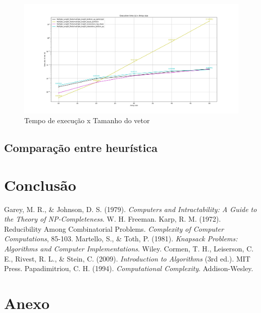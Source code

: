\documentclass{article}
\begin{document}
\begin{figure} [H]
    \centering
    \caption{Tempo de execução x Tamanho do vetor}
    \includegraphics[width=1\textwidth]{images/multiple_length_tabulation_bottom_up}
\end{figure}

\subsection{Comparação entre heurística}


\section{Conclusão}




\begin{thebibliography}{99}
 Garey, M. R., \& Johnson, D. S. (1979). \textit{Computers and Intractability: A Guide to the Theory of NP-Completeness}. W. H. Freeman.
 Karp, R. M. (1972). Reducibility Among Combinatorial Problems. \textit{Complexity of Computer Computations}, 85-103.
 Martello, S., \& Toth, P. (1981). \textit{Knapsack Problems: Algorithms and Computer Implementations}. Wiley.
 Cormen, T. H., Leiserson, C. E., Rivest, R. L., \& Stein, C. (2009). \textit{Introduction to Algorithms} (3rd ed.). MIT Press.
 Papadimitriou, C. H. (1994). \textit{Computational Complexity}. Addison-Wesley.
\end{thebibliography}

\section{Anexo}
\end{document}
